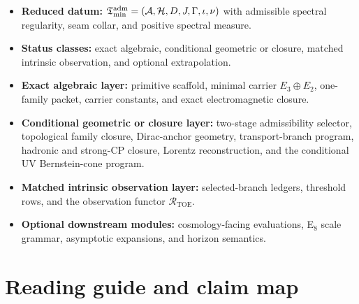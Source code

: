 \begin{tcolorbox}[colback=tfptblue!2, colframe=tfptblue!40, breakable,
    title={Reading Status for the Present Paper}, colbacktitle=tfptblue!60]
\begin{itemize}[leftmargin=1.5em, topsep=3pt, itemsep=3pt]
    \item \textbf{Reduced datum:} $\mathfrak T_{\mathrm{min}}^{\mathrm{adm}}=(\mathcal A,\mathcal H,D,J,\Gamma,\iota,\nu)$ with admissible spectral regularity, seam collar, and positive spectral measure.
    \item \textbf{Status classes:} exact algebraic, conditional geometric or closure, matched intrinsic observation, and optional extrapolation.
    \item \textbf{Exact algebraic layer:} primitive scaffold, minimal carrier $E_3\oplus E_2$, one-family packet, carrier constants, and exact electromagnetic closure.
    \item \textbf{Conditional geometric or closure layer:} two-stage admissibility selector, topological family closure, Dirac-anchor geometry, transport-branch program, hadronic and strong-CP closure, Lorentz reconstruction, and the conditional UV Bernstein-cone program.
    \item \textbf{Matched intrinsic observation layer:} selected-branch ledgers, threshold rows, and the observation functor $\mathcal R_{\mathrm{TOE}}$.
    \item \textbf{Optional downstream modules:} cosmology-facing evaluations, E$_8$ scale grammar, asymptotic expansions, and horizon semantics.
\end{itemize}
\end{tcolorbox}

\tableofcontents

\section{Reading guide and claim map}

